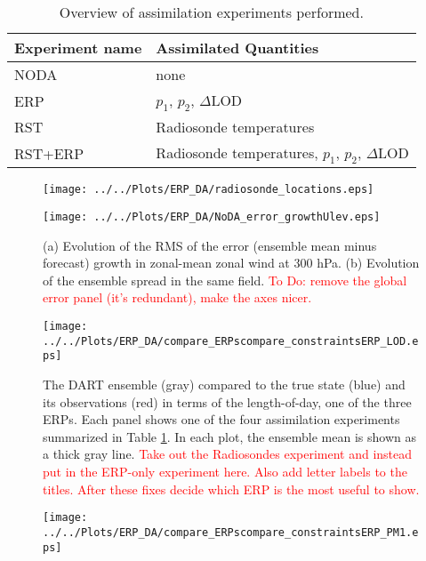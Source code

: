 \documentclass[jgrga]{agutex}
\begin{document}
\begin{table}
\caption{Overview of assimilation experiments performed.}
\centering
\begin{tabular}{ll}
Experiment name &  Assimilated Quantities  \\
\hline
NODA  &  none					\\
ERP  &  $p_1$, $p_2$, $\Delta$LOD	\\
RST  &  Radiosonde temperatures		\\
RST+ERP	 &  Radiosonde temperatures, $p_1$, $p_2$, $\Delta$LOD \\
\hline
\end{tabular}
\label{tab:expts}
\end{table}

 \begin{figure}
\texttt{[image: ../../Plots/ERP\_DA/radiosonde\_locations.eps]} 
 \caption{  }
 \label{fig:RS}
\end{figure}

 \begin{figure}
\texttt{[image: ../../Plots/ERP\_DA/NoDA\_error\_growthUlev.eps]} 
 \caption{(a) Evolution of the RMS of the error (ensemble mean minus forecast) growth in zonal-mean zonal wind at 300 hPa.  (b) Evolution of the ensemble spread in the same field.  \textcolor{red}{To Do: remove the global error panel (it's redundant), make the axes nicer.}  }
 \label{fig:NODA}
\end{figure}


 \begin{figure}
\texttt{[image: ../../Plots/ERP\_DA/compare\_ERPscompare\_constraintsERP\_LOD.eps]} 
 \caption{ The DART ensemble (gray) compared to the true state (blue) and its observations (red) in terms of the length-of-day, one of the three ERPs.  Each panel shows one of the four assimilation experiments summarized in Table \ref{tab:expts}.  In each plot, the ensemble mean is shown as a thick gray line. \textcolor{red}{Take out the Radiosondes experiment and instead put in the ERP-only experiment here. Also add letter labels to the titles.  After these fixes decide which ERP is the most useful to show.} }
 \label{fig:fit_to_LOD}
\end{figure}

 \begin{figure}
\texttt{[image: ../../Plots/ERP\_DA/compare\_ERPscompare\_constraintsERP\_PM1.eps]} 
 \label{fig:fit_to_PM1}
\end{figure}
\end{document}
